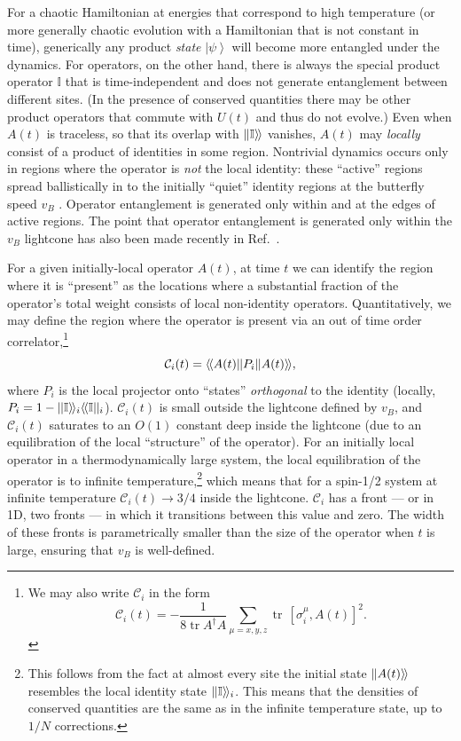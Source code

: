 \documentclass[aps,prx,twocolumn,superscriptaddress,floatfix,nofootinbib,prx]{revtex4}
\newcommand{\f}{\frac}
\renewcommand{\>}{\right\rangle}
\newcommand{\<}{\left\langle}
\newcommand{\be}{\begin{equation}}
\newcommand{\ee}{\end{equation}}
\newcommand{\tr}{\operatorname{tr}}
\newcommand{\ket}[1]{\left| #1 \>}
\newcommand{\opket}[1]{|\hspace{-0.15mm}| #1 \rangle\hspace{-0.5mm}\rangle}
\newcommand{\opbra}[1]{\langle\hspace{-0.5mm}\langle #1 |\hspace{-0.15mm}|}
\begin{document}
For  a chaotic Hamiltonian at energies that correspond to high temperature (or more generally chaotic evolution with a Hamiltonian that is not constant in time), generically any
product \textit{state} $\ket{\psi}$
 will become more entangled under the dynamics. For operators, on the other hand, there is always the special product operator $\mathbb{I}$ that is time-independent and does not generate entanglement between different sites. 
(In the presence of conserved quantities there may be other product operators that  commute with $U(t)$ and thus  do not evolve.)
Even when $A(t)$ is traceless,  so that its overlap with $\opket{\mathbb{I}}$ vanishes, $A(t)$ may \textit{locally} consist of a product of identities in some region.
Nontrivial dynamics occurs only in regions where the operator is \textit{not} the local identity:  these ``active'' regions spread ballistically in to the initially ``quiet'' identity regions at the butterfly speed  $v_B$ \cite{rss}.  Operator entanglement is generated only within and at the edges of active regions.
The point that operator entanglement is generated only within the $v_B$ lightcone has also been made recently in Ref.~\cite{xuswingle2018}.



For a given initially-local operator $A(t)$, at time $t$ we can identify the region where it is ``present'' as the locations where a substantial fraction of the operator's total weight consists of local non-identity operators.  
 Quantitatively, we may define the region where the operator is present via an out of time order correlator,\footnote{We may also write $\mathcal{C}_i$ in the form
\be
\mathcal{C}_i(t) = - \f{1}{8 \tr A^\dag A} \sum_{\mu=x,y,z} \tr \, [\sigma^\mu_i, A(t)]^2.
\ee
}
\be
{\mathcal{C}_i(t) = \opbra{A(t)} P_i \opket{A(t)}},
\ee
where $P_i$ is the local projector onto ``states'' \textit{orthogonal} to the identity (locally, ${P_i = 1-\opket{\mathbb{I}}_i \opbra{\mathbb{I}}_i}$).   $\mathcal{C}_i(t)$ is small outside the lightcone defined by $v_B$, and $\mathcal{C}_i(t)$ saturates to an $O(1)$ constant deep inside the lightcone (due to an equilibration of the local ``structure'' of the operator).  For an initially local operator in a thermodynamically large system, the local equilibration of the operator is to  infinite temperature,\footnote{This follows from the fact at almost every site  the initial state $\opket{A(t)}$ resembles the local identity state $\opket{\mathbb{I}}_i$. This means that the densities of conserved quantities are the same as in the infinite temperature state, up to $1/N$ corrections.} which means that for a spin-1/2 system at infinite temperature $\mathcal{C}_i(t)\rightarrow 3/4$ inside the lightcone. $\mathcal{C}_i$ has a front --- or in 1D, two fronts ---  in which it transitions between this value and zero. The width of these fronts is parametrically smaller than the size of the operator when $t$ is large, ensuring that $v_B$ is well-defined. 
\end{document}
